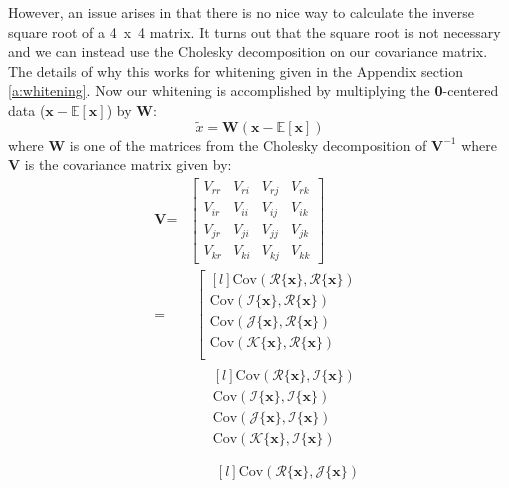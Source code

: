 However, an issue arises in that there is no nice way to calculate the inverse square root of a 4~x~4 matrix.
It turns out that the square root is not necessary and we can instead use the Cholesky decomposition on our covariance matrix.
The details of why this works for whitening given in the Appendix section \ref{a:whitening}.
Now our whitening is accomplished by multiplying the \textbf{0}-centered data ($\textbf{x} - \mathbb{E}[\textbf{x}]$) by \textbf{W}:
\begin{equation}
\tilde{x} = \textbf{W}(\textbf{x} - \mathbb{E}[\textbf{x}])
\label{eq:white4d}
\end{equation}
where \textbf{W} is one of the matrices from the Cholesky decomposition of $\textbf{V}^{-1}$ where \textbf{V} is the covariance matrix given by:
\begin{align}
\textbf{V}
=&
\begin{bmatrix}
 V_{rr} & V_{ri} & V_{rj} & V_{rk} \\
 V_{ir} & V_{ii} & V_{ij} & V_{ik} \\
 V_{jr} & V_{ji} & V_{jj} & V_{jk} \\
 V_{kr} & V_{ki} & V_{kj} & V_{kk}
\end{bmatrix} \nonumber \\
=&~~  \left[ 
\begin{matrix*}[l]
\mbox{Cov}(\mathscr{R}\{\textbf{x}\}, \mathscr{R}\{\textbf{x}\}) \\
\mbox{Cov}(\mathscr{I}\{\textbf{x}\}, \mathscr{R}\{\textbf{x}\}) \\
\mbox{Cov}(\mathscr{J}\{\textbf{x}\}, \mathscr{R}\{\textbf{x}\}) \\
\mbox{Cov}(\mathscr{K}\{\textbf{x}\}, \mathscr{R}\{\textbf{x}\}) \\
\end{matrix*} \right. \nonumber \\ 
&~~~~~~
\begin{matrix*}[l]
\mbox{Cov}(\mathscr{R}\{\textbf{x}\}, \mathscr{I}\{\textbf{x}\}) \\
\mbox{Cov}(\mathscr{I}\{\textbf{x}\}, \mathscr{I}\{\textbf{x}\}) \\
\mbox{Cov}(\mathscr{J}\{\textbf{x}\}, \mathscr{I}\{\textbf{x}\}) \\
\mbox{Cov}(\mathscr{K}\{\textbf{x}\}, \mathscr{I}\{\textbf{x}\}) \\
\end{matrix*} \nonumber \\
&~~~~~~~
\begin{matrix*}[l]
\mbox{Cov}(\mathscr{R}\{\textbf{x}\}, \mathscr{J}\{\textbf{x}\}) \\

\end{matrix*}
\end{align}
